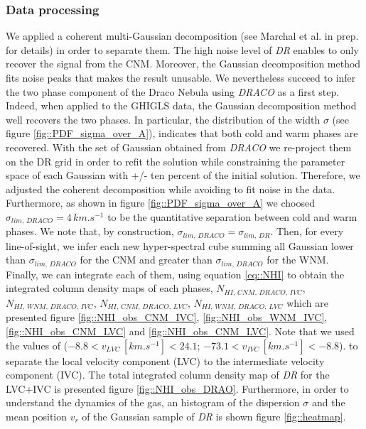 \documentclass[traditabstract]{aa}
\begin{document}
\subsubsection{Data processing}
We applied a coherent multi-Gaussian decomposition (see Marchal et al. in prep. for details) in order to separate them. 
The high noise level of \textit{DR} enables to only recover the signal from the CNM. Moreover, the Gaussian decomposition 
method fits noise peaks that makes the result unusable. We nevertheless succeed to infer the two phase component of the Draco Nebula 
using \textit{DRACO} as a first step. Indeed, when applied to the GHIGLS data, the Gaussian decomposition method well 
recovers the two phases. In particular, the distribution of the width $\sigma$ (see figure \ref{fig::PDF_sigma_over_A}), indicates 
that both cold and warm phases are recovered. With the set of Gaussian obtained from \textit{DRACO} we re-project them on the DR grid 
in order to refit the solution while constraining the parameter space of each Gaussian with +/- ten percent of the initial solution. 
Therefore, we adjusted the coherent decomposition while avoiding to fit noise in the data. Furthermore, as shown in figure 
\ref{fig::PDF_sigma_over_A} we choosed $\sigma_{lim, \, \textit{DRACO}} = 4 \, km.s^{-1}$ to be the quantitative separation between 
cold and warm phases. We note that, by construction, $\sigma_{lim, \, \textit{DRACO}} = \sigma_{lim, \, \textit{DR}}$. Then, for every 
line-of-sight, we infer each new hyper-spectral cube summing all Gaussian lower than $\sigma_{lim, \, \textit{DRACO}}$ for the CNM 
and greater than $\sigma_{lim, \, \textit{DRACO}}$ for the WNM. Finally, we can integrate each of them, using equation \ref{eq::NHI} 
to obtain the integrated column density maps of each phases, $N_{HI, \, CNM, \, \textit{DRACO}, \, IVC}$, 
$N_{HI, \, WNM, \, \textit{DRACO}, \, IVC}$, $N_{HI, \, CNM, \, \textit{DRACO}, \, LVC}$, 
$N_{HI, \, WNM, \, \textit{DRACO}, \, LVC}$ which are presented figure \ref{fig::NHI_obs_CNM_IVC}, \ref{fig::NHI_obs_WNM_IVC}, 
\ref{fig::NHI_obs_CNM_LVC} and \ref{fig::NHI_obs_CNM_LVC}. Note that we used the values of \cite{Planck_XXIV_2011} ($-8.8 < v_{LVC} \, [km.s^{-1}] < 24.1$; $-73.1 <v_{IVC} \, [km.s^{-1}] < -8.8$). 
to separate the local velocity component (LVC) to the intermediate velocity component (IVC). The total integrated column density map of \textit{DR} for the LVC+IVC 
is presented figure \ref{fig::NHI_obs_DRAO}. Furthermore, in order to understand the dynamics of the gas, an histogram of the 
dispersion $\sigma$ and the mean position $v_{r}$ of the Gaussian sample of \textit{DR} is shown figure \ref{fig::heatmap}.
\end{document}
